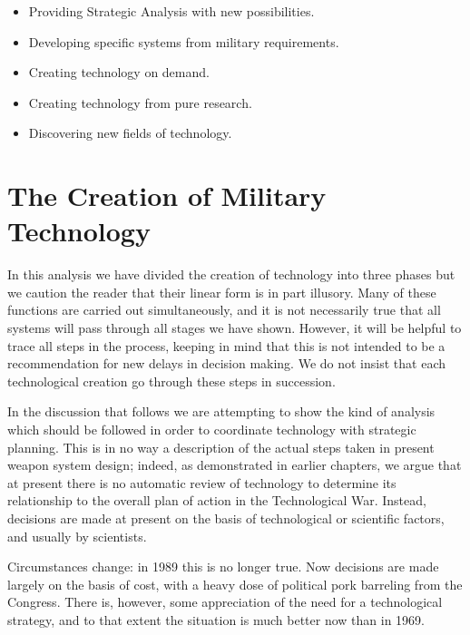 \begin{mdframed}[frametitle={CHART 10: Duties of the Technological Community}]
    \begin{itemize}
        \item Providing Strategic Analysis with new possibilities.
        \item Developing specific systems from military requirements.
        \item Creating technology on demand.
        \item Creating technology from pure research.
        \item Discovering new fields of technology.
    \end{itemize}
\end{mdframed}

\section{The Creation of Military Technology}

In this analysis we have divided the creation of technology into three phases but we caution the reader that their linear form is in part illusory. Many of these functions are carried out simultaneously, and it is not necessarily true that all systems will pass through all stages we have shown. However, it will be helpful to trace all steps in the process, keeping in mind that this is not intended to be a recommendation for new delays in decision making. We do not insist that each technological creation go through these steps in succession.

In the discussion that follows we are attempting to show the kind of analysis which should be followed in order to coordinate technology with strategic planning. This is in no way a description of the actual steps taken in present weapon system design; indeed, as demonstrated in earlier chapters, we argue that at present there is no automatic review of technology to determine its relationship to the overall plan of action in the Technological War. Instead, decisions are made at present on the basis of technological or scientific factors, and usually by scientists.

\begin{mdframed}[backgroundcolor=black!10]
Circumstances change: in 1989 this is no longer true. Now decisions are made largely on the basis of cost, with a heavy dose of political pork barreling from the Congress. There is, however, some appreciation of the need for a technological strategy, and to that extent the situation is much better now than in 1969.
\end{mdframed}

